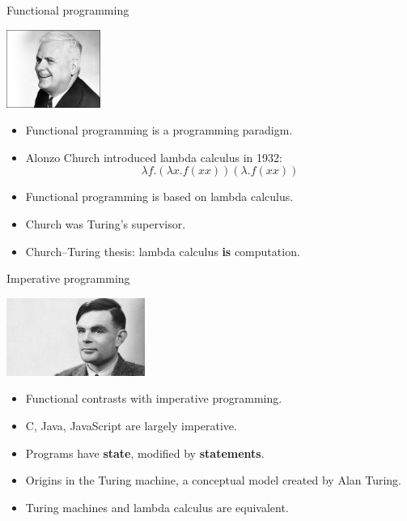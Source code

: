 \begin{frame}{Functional programming}
  \begin{center}
    \includegraphics[height=1in]{img/church.jpg}
  \end{center}
  \begin{itemize}
    \item Functional programming is a programming paradigm.
    \item Alonzo Church introduced lambda calculus in 1932:
      $$ \lambda f . ( \lambda x . f ( x x ) ) ( \lambda . f ( x x ) )$$
    \item Functional programming is based on lambda calculus.
    \item Church was Turing's supervisor.
    \item Church--Turing thesis: lambda calculus \textbf{is} computation.
  \end{itemize}
\end{frame}

\begin{frame}{Imperative programming}
  \begin{center}
    \includegraphics[height=1in]{img/alanturing.jpg}
  \end{center}
  \begin{itemize}
    \item Functional contrasts with imperative programming.
    \item C, Java, JavaScript are largely imperative.
    \item Programs have \textbf{state}, modified by \textbf{statements}.
    \item Origins in the Turing machine, a conceptual model created by Alan Turing.
    \item Turing machines and lambda calculus are equivalent.
  \end{itemize}
\end{frame}


